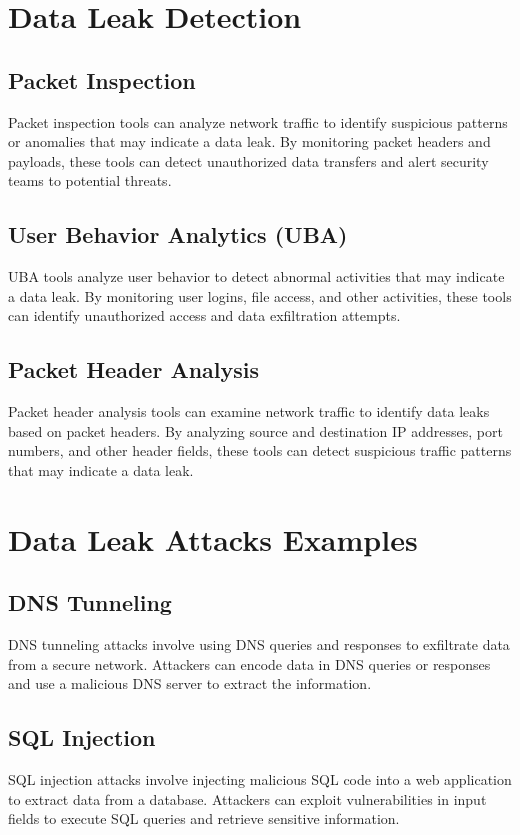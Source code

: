 \documentclass{article}
\begin{document}
\section{Data Leak Detection}

\subsection{Packet Inspection}
Packet inspection tools can analyze network traffic to identify suspicious patterns or anomalies that may indicate a data leak. By monitoring packet headers and payloads, these tools can detect unauthorized data transfers and alert security teams to potential threats.

\subsection{User Behavior Analytics (UBA)}
UBA tools analyze user behavior to detect abnormal activities that may indicate a data leak. By monitoring user logins, file access, and other activities, these tools can identify unauthorized access and data exfiltration attempts.

\subsection{Packet Header Analysis}
Packet header analysis tools can examine network traffic to identify data leaks based on packet headers. By analyzing source and destination IP addresses, port numbers, and other header fields, these tools can detect suspicious traffic patterns that may indicate a data leak.

\section{Data Leak Attacks Examples}

\subsection{DNS Tunneling}
DNS tunneling attacks involve using DNS queries and responses to exfiltrate data from a secure network. Attackers can encode data in DNS queries or responses and use a malicious DNS server to extract the information.

\subsection{SQL Injection}
SQL injection attacks involve injecting malicious SQL code into a web application to extract data from a database. Attackers can exploit vulnerabilities in input fields to execute SQL queries and retrieve sensitive information.
\end{document}

